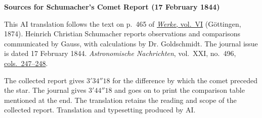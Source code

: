 \clearpage\thispagestyle{empty}
\begin{center}\textbf{Sources for Schumacher’s Comet Report (17 February 1844)}\end{center}
\noindent This AI translation follows the text on p.~465 of \href{https://gdz.sub.uni-goettingen.de/id/PPN236007467}{\textit{Werke}, vol.~VI} (Göttingen, 1874). Heinrich Christian Schumacher reports observations and comparisons communicated by Gauss, with calculations by Dr. Goldschmidt. The journal issue is dated 17 February 1844. \textit{Astronomische Nachrichten}, vol.~XXI, no.~496, \href{https://api.digitale-sammlungen.de/iiif/image/v2/bsb10049446_00132/full/1800,/0/default.jpg}{cols.~247--248}.
\par\smallskip\noindent The collected report gives $3'34''18$ for the difference by which the comet preceded the star. The journal gives $3'44''18$ and goes on to print the comparison table mentioned at the end. The translation retains the reading and scope of the collected report. Translation and typesetting produced by AI.
\clearpage
